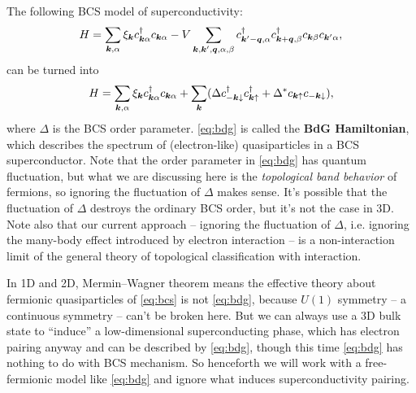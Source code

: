 \documentclass[hyperref, a4paper]{article}
\newcommand*{\concept}[1]{{\textbf{#1}}}
\begin{document}
The following BCS model of superconductivity:
\begin{equation}
    H = \sum_{\vb*{k}, \alpha} \xi_{\vb*{k}} c^\dagger_{\vb*{k} \alpha} c_{\vb*{k} \alpha} - V \sum_{\vb*{k}, \vb*{k}', \vb*{q}, \alpha, \beta} c^\dagger_{\vb*{k}' - \vb*{q}, \alpha} c^\dagger_{\vb*{k} + \vb*{q}, \beta} c_{\vb*{k} \beta} c_{\vb*{k}' \alpha},
    \label{eq:bcs}
\end{equation}
can be turned into 
\begin{equation}
    H = \sum_{\vb*{k}, \alpha} \xi_{\vb*{k}} c^\dagger_{\vb*{k} \alpha} c_{\vb*{k} \alpha} 
    + \sum_{\vb*{k}} (\Delta c^\dagger_{- \vb*{k} \downarrow} c^\dagger_{\vb*{k} \uparrow} + \Delta^* c_{\vb*{k} \uparrow} c_{- \vb*{k} \downarrow}),
    \label{eq:bdg}
\end{equation}
where $\Delta$ is the BCS order parameter. \eqref{eq:bdg} is called the \concept{BdG Hamiltonian}, 
which describes the spectrum of (electron-like) quasiparticles in a BCS superconductor. Note that 
the order parameter in \eqref{eq:bdg} has quantum fluctuation, but what we are discussing here is 
the \emph{topological band behavior} of fermions, so ignoring the fluctuation of $\Delta$ makes sense.
It's possible that the fluctuation of $\Delta$ destroys the ordinary BCS order, but it's not the case 
in 3D. Note also that our current approach -- ignoring the fluctuation of $\Delta$, i.e. ignoring the 
many-body effect introduced by electron interaction -- is a non-interaction limit of the general theory 
of topological classification with interaction. 

In 1D and 2D, Mermin–Wagner theorem means the 
effective theory about fermionic quasiparticles of \eqref{eq:bcs} is not \eqref{eq:bdg}, because 
$U(1)$ symmetry -- a continuous symmetry -- can't be broken here. But we can always use a 
3D bulk state to ``induce'' a low-dimensional superconducting phase, which has electron pairing anyway
and can be described by \eqref{eq:bdg}, though this time \eqref{eq:bdg} has nothing to do with BCS mechanism.
So henceforth we will work with a free-fermionic model like \eqref{eq:bdg} and ignore what induces superconductivity
pairing. 
\end{document}
